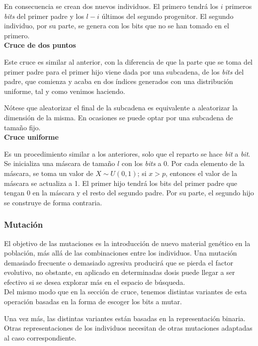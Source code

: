 			En consecuencia se crean dos nuevos individuos. El primero tendr\'a los $i$ primeros \textit{bits} del primer padre y los $l-i$ \'ultimos del segundo progenitor. El segundo individuo, por su parte, se genera con los bits que no se han tomado en el primero.\\
			
			\textbf{Cruce de dos puntos}

			Este cruce es similar al anterior, con la diferencia de que la parte que se toma del primer padre para el primer hijo viene dada por una subcadena, de los \textit{bits} del padre, que comienza y acaba en dos \'indices generados con una distribuci\'on uniforme, tal y como venimos haciendo.
			
			N\'otese que aleatorizar el final de la subcadena es equivalente a aleatorizar la dimensi\'on de la misma. En ocasiones se puede optar por una subcadena de tama\~no fijo. \\
			
			\textbf{Cruce uniforme}
			
			Es un procedimiento similar a los anteriores, solo que el reparto se hace \textit{bit} a \textit{bit}. Se inicializa una m\'ascara de tama\~no $l$ con los \textit{bits} a 0. Por cada elemento de la m\'ascara, se toma un valor de $X \sim U(0,1)$; si $x > p$, entonces el valor de la m\'ascara se actualiza a 1. El primer hijo tendr\'a los bits del primer padre que tengan 0 en la m\'ascara y el resto del segundo padre. Por su parte, el segundo hijo se construye de forma contraria. 
			
			
			\subsubsection{Mutaci\'on}

			El objetivo de las mutaciones es la introducci\'on de nuevo material gen\'etico en la poblaci\'on, m\'as all\'a de las combinaciones entre los individuos. Una mutaci\'on demasiado frecuente o demasiado agresiva producir\'a que se pierda el factor evolutivo, no obstante, en aplicado en determinadas dosis puede llegar a ser efectivo si se desea explorar m\'as en el espacio de b\'usqueda.\\
			
			Del mismo modo que en la secci\'on de cruce, tenemos distintas variantes de esta operaci\'on basadas en la forma de escoger los bits a mutar.
			
			Una vez m\'as, las distintas variantes est\'an basadas en la representaci\'on binaria. Otras representaciones de los individuos necesitan de otras mutaciones adaptadas al caso correspondiente.\\
			
